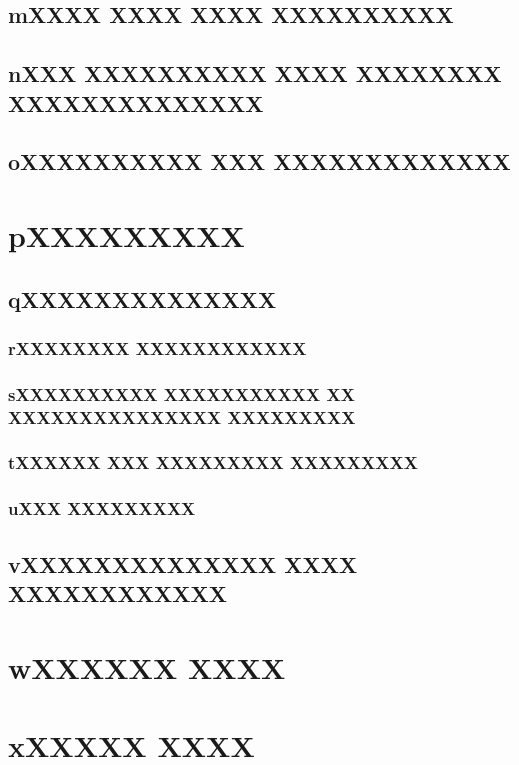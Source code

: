 \documentclass{acmart}
\begin{document}
\subsection{mXXXX XXXX XXXX XXXXXXXXXX}\subsection{nXXX XXXXXXXXXX XXXX XXXXXXXX XXXXXXXXXXXXXX}
\subsection{oXXXXXXXXXX XXX XXXXXXXXXXXXX}
\section{pXXXXXXXXX}\subsection{qXXXXXXXXXXXXXX}
\subsubsection{rXXXXXXXX XXXXXXXXXXXX}\subsubsection{sXXXXXXXXXX XXXXXXXXXXX XX XXXXXXXXXXXXXXX XXXXXXXXX}
\subsubsection{tXXXXXX XXX XXXXXXXXX XXXXXXXXX}\subsubsection{uXXX XXXXXXXXX}\subsection{vXXXXXXXXXXXXXX XXXX XXXXXXXXXXXX}
\section{wXXXXXX XXXX}
\section{xXXXXX XXXX}
\end{document}
